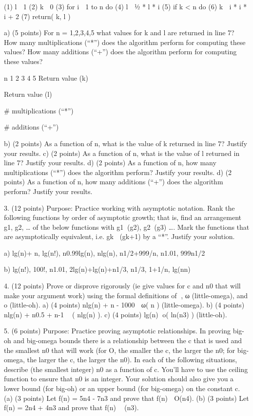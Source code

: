     (1) l  1
    (2) k  0
(3) for i  1 to n do
(4)	l  ½ * l  * i
(5)	if  k < n  do
(6)		k  i * i * i + 2
(7) return( k, l )


a) (5 points) For n = 1,2,3,4,5 what values for k and l are returned in line 7? How many multiplications (“*”) does the algorithm perform for computing these values? How many additions (“+”) does the algorithm perform for computing these values?

                            n  1  2  3  4  5
Return value (k)

Return value (l)

# multiplications (“*”)

# additions (“+”)


b) (2 points) As a function of n, what is the value of k returned in line 7? Justify your results.
c) (2 points) As a function of n, what is the value of l returned in line 7? Justify your results.
d) (2 points) As a function of n, how many multiplications (“*”) does the algorithm perform? Justify your results.
d) (2 points) As a function of n, how many additions (“+”) does the algorithm perform? Justify your results.

3. (12 points) Purpose: Practice working with asymptotic notation. Rank the following functions by order of asymptotic growth; that is, find an arrangement g1, g2, … of the below functions with g1(g2), g2(g3) …. Mark the functions that are asymptotically equivalent, i.e. gk (gk+1) by a “*”. Justify your solution.

a) lg(n)+ n,	lg(n!),	n0.99lg(n),	nlg(n),	n1/2+999/n,	n1.01,		999n1/2

b) lg(n!),	100!,	n1.01,	2lg(n)+lg(n)+n1/3,		n1/3,	1+1/n,	 	lg(nn)

4. (12 points) Prove or disprove rigorously (ie give values for c and n0 that will make your argument work) using the formal definitions of , ω (little-omega), and o (little-oh).
a) (4 points) nlg(n) + n - 1000  ω( n )  (little-omega).
b) (4 points) nlg(n) + n0.5 + n-1  ( nlg(n) ).
c) (4 points) lg(n) o( ln(n3) ) (little-oh).

5. (6 points) Purpose: Practice proving asymptotic relationships. In proving big-oh and big-omega bounds there is a relationship between the c that is used and the smallest n0 that will work (for O, the smaller the c, the larger the n0; for big-omega, the larger the c, the larger the n0). In each of the following situations, describe (the smallest integer) n0 as a function of c. You'll have to use the ceiling function to ensure that n0 is an integer. Your solution should also give you a lower bound (for big-oh) or an upper bound (for big-omega) on the constant c.
(a) (3 points) Let f(n) = 5n4 - 7n3 and prove that f(n)  O(n4).
(b) (3 points) Let f(n) = 2n4 + 4n3 and prove that f(n)  (n3).

